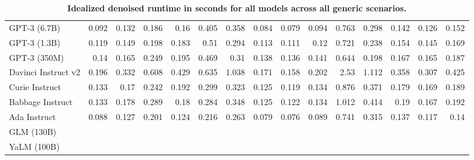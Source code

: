 \begin{table}[htp]
{\begin{tabular}{lrrrrrrrrrrrrrr}
GPT-3 (6.7B) & 0.092 & 0.132 & 0.186 & 0.16 & 0.405 & 0.358 & 0.084 & 0.079 & 0.094 & 0.763 & 0.298 & 0.142 & 0.126 & 0.152 \\
GPT-3 (1.3B) & 0.119 & 0.149 & 0.198 & 0.183 & 0.51 & 0.294 & 0.113 & 0.111 & 0.12 & 0.721 & 0.238 & 0.154 & 0.145 & 0.169 \\
GPT-3 (350M) & 0.14 & 0.165 & 0.249 & 0.195 & 0.469 & 0.31 & 0.138 & 0.136 & 0.141 & 0.644 & 0.198 & 0.167 & 0.165 & 0.187 \\
Davinci Instruct v2 & 0.196 & 0.332 & 0.608 & 0.429 & 0.635 & 1.038 & 0.171 & 0.158 & 0.202 & 2.53 & 1.112 & 0.358 & 0.307 & 0.425 \\
Curie Instruct & 0.133 & 0.17 & 0.242 & 0.192 & 0.299 & 0.323 & 0.125 & 0.119 & 0.134 & 0.876 & 0.371 & 0.179 & 0.169 & 0.189 \\
Babbage Instruct & 0.133 & 0.178 & 0.289 & 0.18 & 0.284 & 0.348 & 0.125 & 0.122 & 0.134 & 1.012 & 0.414 & 0.19 & 0.167 & 0.192 \\
Ada Instruct & 0.088 & 0.127 & 0.201 & 0.124 & 0.216 & 0.263 & 0.079 & 0.076 & 0.089 & 0.741 & 0.315 & 0.137 & 0.117 & 0.14 \\
GLM (130B) &  &  &  &  &  &  &  &  &  &  &  &  &  &  \\
YaLM (100B) &  &  &  &  &  &  &  &  &  &  &  &  &  &  \\
\bottomrule
\end{tabular}}
\caption{\textbf{Idealized denoised runtime in seconds for all models across all generic scenarios.}}
\label{tab:efficiency-generic}
\end{table}